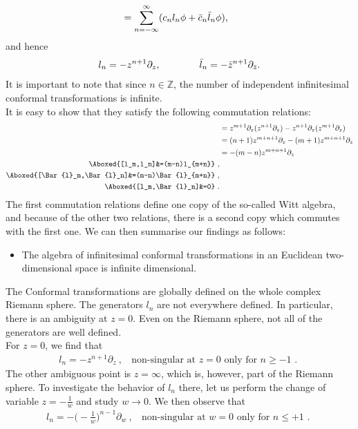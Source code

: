 \documentclass[]{article}
\numberwithin{equation}{section}
\begin{document}
{{\begin{align}
    &=\sum_{n=-\infty}^{\infty}(c_nl_n\phi+\Bar{c}_n\Bar{l}_n\phi),
\end{align}
and hence
\begin{align}
    l_n=-z^{n+1}\partial_{z},~~~~~~~~~~~~\Bar{l}_n=-\Bar{z}^{n+1}\partial_{\Bar{z}}.
\end{align}
It is important to note that since $n\in\mathbb{Z}$, the number of independent infinitesimal conformal transformations is infinite. \\
It is easy to show that they satisfy the following commutation relations:
\begin{align}
    [l_m,l_n]&=z^{m+1}\partial_z(z^{n+1}\partial_z)-z^{n+1}\partial_z(z^{m+1}\partial_z)\nonumber\\
    &=(n+1)z^{m+n+1}\partial_z-(m+1)z^{m+n+1}\partial_z\nonumber\\
    &=-(m-n)z^{m+n+1}\partial_z\nonumber\\
    \Aboxed{[l_m,l_n]&=(m-n)l_{m+n}}~,\\
    \Aboxed{[\Bar{l}_m,\Bar{l}_n]&=(m-n)\Bar{l}_{m+n}}~,\\
    \Aboxed{[l_m,\Bar{l}_n]&=0}~.
\end{align}
The first commutation relations define one copy of the so-called Witt algebra, and because of the other two relations, there is a second copy which commutes with the first one. We can then summarise our findings as follows:
\begin{itemize}
    \item The algebra of infinitesimal conformal transformations in an Euclidean two-dimensional space is infinite dimensional.
\end{itemize}
The Conformal transformations are globally defined on the
whole complex Riemann sphere.
The generators $l_n$ are not everywhere defined. In
particular, there is an ambiguity at \textbf{$z = 0$}. Even on the Riemann sphere, not all of the generators are well defined.\\
For $z = 0$, we find that
\begin{align}
    l_n=-z^{n+1}\partial_z~,~~~~\text{non-singular at $z=0$ only for $n\ge-1$~. }
\end{align}
The other ambiguous point is \textbf{$z=\infty$}, which is, however, part of the Riemann sphere. To investigate the behavior of $l_n$ there, let us perform the change of variable $z=-\frac{1}{w}$ and study $w\rightarrow0$. We then observe that
\begin{align}
    l_n=-\bigg(-\frac{1}{w}\bigg)^{n-1}\partial_w~,~~~~\text{non-singular at $w=0$ only for $n\le+1$~. }

\end{align}}}
\end{document}
